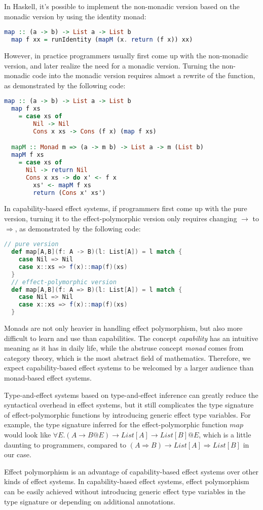 In Haskell, it's possible to implement the non-monadic version based
on the monadic version by using the identity monad:

\begin{lstlisting}[language=Haskell]
  map :: (a -> b) -> List a -> List b
  map f xx = runIdentity (mapM (x. return (f x)) xx)
\end{lstlisting}

However, in practice programmers usually first come up with the
non-monadic version, and later realize the need for a monadic
version. Turning the non-monadic code into the monadic version
requires almost a rewrite of the function, as demonstrated by the
following code:

\begin{lstlisting}[language=Haskell]
  map :: (a -> b) -> List a -> List b
  map f xs
    = case xs of
        Nil -> Nil
        Cons x xs -> Cons (f x) (map f xs)

  mapM :: Monad m => (a -> m b) -> List a -> m (List b)
  mapM f xs
    = case xs of
      Nil -> return Nil
      Cons x xs -> do x' <- f x
        xs' <- mapM f xs
        return (Cons x' xs')
\end{lstlisting}

In capability-based effect systems, if programmers first come up with
the pure version, turning it to the effect-polymorphic version only
requires changing $\to$ to $\Rightarrow$, as demonstrated by the
following code:

\begin{lstlisting}[language=Scala]
  // pure version
  def map[A,B](f: A -> B)(l: List[A]) = l match {
    case Nil => Nil
    case x::xs => f(x)::map(f)(xs)
  }
  // effect-polymorphic version
  def map[A,B](f: A => B)(l: List[A]) = l match {
    case Nil => Nil
    case x::xs => f(x)::map(f)(xs)
  }
\end{lstlisting}

Monads are not only heavier in handling effect polymorphism, but also
more difficult to learn and use than capabilities. The concept
\emph{capability} has an intuitive meaning as it has in daily life,
while the abstruse concept \emph{monad} comes from category theory,
which is the most abstract field of mathematics. Therefore, we expect
capability-based effect systems to be welcomed by a larger audience
than monad-based effect systems.

Type-and-effect systems based on type-and-effect
inference\cite{talpin1992polymorphic, talpin1994type} can greatly
reduce the syntactical overhead in effect systems, but it still
complicates the type signature of effect-polymorphic functions by
introducing generic effect type variables. For example, the type
signature inferred for the effect-polymorphic function $map$ would
look like $\forall E.(A \to B @E) \to List[A] \to List[B] @E$, which
is a little daunting to programmers, compared to
$(A \Rightarrow B) \to List[A] \Rightarrow List[B]$ in our case.

Effect polymorphism is an advantage of capability-based effect systems
over other kinds of effect systems. In capability-based effect
systems, effect polymorphism can be easily achieved without
introducing generic effect type variables in the type signature or
depending on additional annotations.
